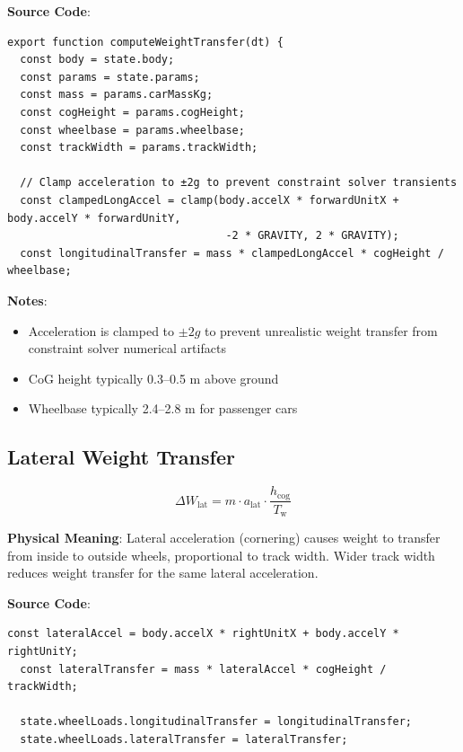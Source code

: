 \textbf{Source Code}: 

\begin{lstlisting}[caption={Longitudinal weight transfer computation}]
export function computeWeightTransfer(dt) {
  const body = state.body;
  const params = state.params;
  const mass = params.carMassKg;
  const cogHeight = params.cogHeight;
  const wheelbase = params.wheelbase;
  const trackWidth = params.trackWidth;

  // Clamp acceleration to ±2g to prevent constraint solver transients
  const clampedLongAccel = clamp(body.accelX * forwardUnitX + body.accelY * forwardUnitY,
                                  -2 * GRAVITY, 2 * GRAVITY);
  const longitudinalTransfer = mass * clampedLongAccel * cogHeight / wheelbase;
\end{lstlisting}

\textbf{Notes}:
\begin{itemize}
  \item Acceleration is clamped to $\pm 2g$ to prevent unrealistic weight transfer from constraint solver numerical artifacts
  \item CoG height typically 0.3–0.5 m above ground
  \item Wheelbase typically 2.4–2.8 m for passenger cars
\end{itemize}

\subsection{Lateral Weight Transfer}

\begin{equation}
  \Delta W_{\text{lat}} = m \cdot a_{\text{lat}} \cdot \frac{h_{\text{cog}}}{T_{\text{w}}}
  \label{eq:lateral-transfer}
\end{equation}

\textbf{Physical Meaning}: Lateral acceleration (cornering) causes weight to transfer from inside to outside wheels, proportional to track width. Wider track width reduces weight transfer for the same lateral acceleration.

\textbf{Source Code}: 

\begin{lstlisting}[caption={Lateral weight transfer computation}]
  const lateralAccel = body.accelX * rightUnitX + body.accelY * rightUnitY;
  const lateralTransfer = mass * lateralAccel * cogHeight / trackWidth;

  state.wheelLoads.longitudinalTransfer = longitudinalTransfer;
  state.wheelLoads.lateralTransfer = lateralTransfer;
\end{lstlisting}

